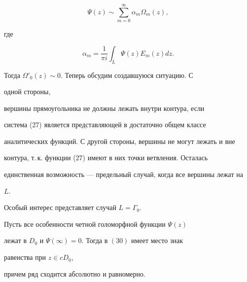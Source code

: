 \begin{equation} 


\Psi(z)\sim\sum^\infty_{m=0}\alpha_m \Omega_m(z), 


\end{equation} 


где 


$$ 


\alpha_m=\frac{1}{\pi i}\int_L \Psi(z)E_m(z)d z. 


$$ 


Тогда $\Omega'_0(z)\sim0$. Теперь обсудим создавшуюся ситуацию. С 


одной стороны, 


вершины прямоугольника не должны лежать внутри контура, если 


система (27) является представляющей в достаточно общем классе  


аналитических функций. С другой стороны, вершины не могут лежать и вне  


контура, т.\,к. функции (27) имеют в них точки ветвления. Осталась  


единственная возможность --- предельный случай, когда все вершины лежат на  


$L$. 


Особый интерес представляет случай $L=\Gamma_0$. 


 


\begin{thm} 


Пусть все особенности четной голоморфной функции $\Psi(z)$ 


лежат в $D_0$ и $\Psi(\infty)=0$. Тогда в $(30)$ имеет место знак 


равенства при $z\in c D_0$,  


причем ряд сходится абсолютно и равномерно. 


\end{thm} 


 


